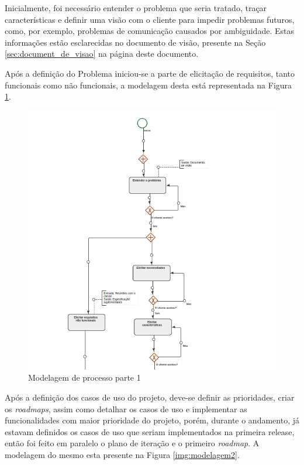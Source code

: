 
Inicialmente, foi necessário entender o problema que seria tratado, traçar características e definir uma visão com o cliente para impedir problemas futuros, como, por exemplo, problemas de comunicação causados por ambiguidade. Estas informações estão esclarecidas no documento de visão, presente na Seção \ref{sec:document_de_visao} na página \pageref{sec:document_de_visao} deste documento.

Após a definição do Problema iniciou-se a parte de elicitação de requisitos, tanto funcionais como não funcionais, a modelagem desta está representada na Figura \ref{img:modelagem1}.

\begin{figure}[H]
	\centering
	\includegraphics[width=1\textwidth]{imgModelagem/modelagem1}
	\caption{Modelagem de processo parte 1}
	\label{img:modelagem1}
\end{figure}

Após a definição dos casos de uso do projeto, deve-se definir as prioridades, criar os \textit{roadmaps}, assim como detalhar os casos de uso e implementar as funcionalidades com maior prioridade do projeto, porém, durante o andamento, já estavam definidos os casos de uso que seriam implementados na primeira release, então foi feito em paralelo o plano de iteração e o primeiro \textit{roadmap}. A modelagem do mesmo esta presente na Figura \ref{img:modelagem2}.

